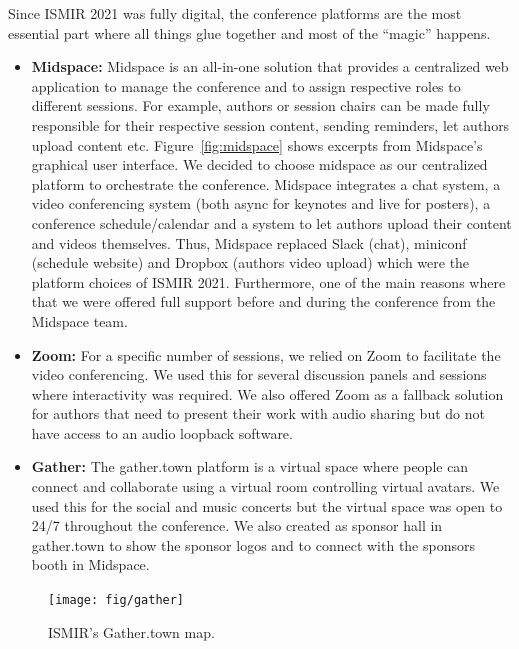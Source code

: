 \documentclass[%
10pt,								%
titlepage,						%
]
{scrartcl}
\begin{document}
        Since ISMIR 2021 was fully digital, the conference platforms are the most essential part where all things glue together and most of the ``magic'' happens.

        \begin{itemize}
            \item \textbf{Midspace:} Midspace is an all-in-one solution that provides a centralized web application to manage the conference and to assign respective roles to different sessions. For example, authors or session chairs can be made fully responsible for their respective session content, sending reminders, let authors upload content etc. Figure~\ref{fig:midspace} shows excerpts from Midspace's graphical user interface. We decided to choose midspace as our centralized platform to orchestrate the conference. Midspace integrates a chat system, a video conferencing system (both async for keynotes and live for posters), a conference schedule/calendar and a system to let authors upload their content and videos themselves. Thus, Midspace replaced Slack (chat), miniconf (schedule website) and Dropbox (authors video upload) which were the platform choices of ISMIR 2021. Furthermore, one of the main reasons where that we were offered full support before and during the conference from the Midspace team. 
            \item \textbf{Zoom:} For a specific number of sessions, we relied on Zoom to facilitate the video conferencing. We used this for several discussion panels and sessions where interactivity was required. We also offered Zoom as a fallback solution for authors that need to present their work with audio sharing but do not have access to an audio loopback software.
            \item \textbf{Gather:} The gather.town platform is a virtual space where people can connect and collaborate using a virtual room controlling virtual avatars. We used this for the social and music concerts but the virtual space was open to 24/7 throughout the conference. We also created as sponsor hall in gather.town to show the sponsor logos and to connect with the sponsors booth in Midspace.
        \end{itemize}

        \begin{figure}[t]%
            \centering
            \texttt{[image: fig/gather]}%
            \caption{ISMIR's Gather.town map.}%
            \label{fig:gather}%
        \end{figure}
\end{document}

